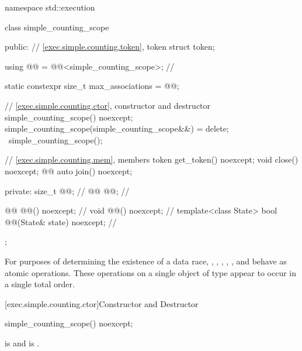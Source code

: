 %
\begin{codeblock}
namespace std::execution {
  class simple_counting_scope {
  public:
    // \ref{exec.simple.counting.token}, token
    struct token;

    using @@ = @@<simple_counting_scope>;     // \expos

    static constexpr size_t max_associations = @@;

    // \ref{exec.simple.counting.ctor}, constructor and destructor
    simple_counting_scope() noexcept;
    simple_counting_scope(simple_counting_scope&&) = delete;
    ~simple_counting_scope();

    // \ref{exec.simple.counting.mem}, members
    token get_token() noexcept;
    void close() noexcept;
    @@ auto join() noexcept;

  private:
    size_t @@;                                       // \expos
    @@ @@;                             // \expos

    @@ @@() noexcept;                   // \expos
    void @@() noexcept;                       // \expos
    template<class State>
      bool @@(State& state) noexcept;    // \expos
  };
}
\end{codeblock}

\pnum
For purposes of determining the existence of a data race,
,
,
,
,
, and
behave as atomic operations.
These operations on a single object of
type  appear to occur in a single total order.

[exec.simple.counting.ctor]{Constructor and Destructor}

%
\begin{itemdecl}
simple_counting_scope() noexcept;
\end{itemdecl}

\begin{itemdescr}
\pnum
\ensures
{} is  and  is .
\end{itemdescr}

